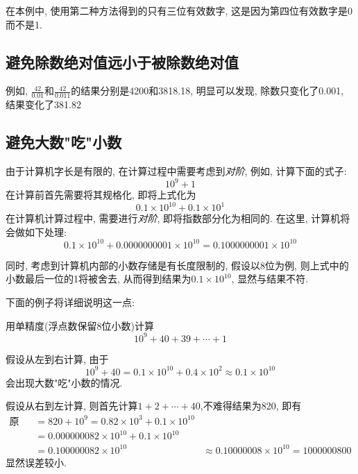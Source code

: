 \begin{notice}
    在本例中, 使用第二种方法得到的只有三位有效数字, 这是因为第四位有效数字是0而不是1.
\end{notice}

\subsection{避免除数绝对值远小于被除数绝对值}

例如, $\frac{42}{0.01}$和$\frac{42}{0.011}$的结果分别是4200和3818.18, 明显可以发现, 除数只变化了0.001, 结果变化了381.82

\subsection{避免大数"吃"小数}

由于计算机字长是有限的, 在计算过程中需要考虑到\emph{对阶}, 例如, 计算下面的式子:
\begin{equation*}
    10^{9}+1
\end{equation*}
在计算前首先需要将其规格化, 即将上式化为
\begin{equation*}
    0.1\times10^{10}+0.1\times10^1
\end{equation*}
在计算机计算过程中, 需要进行\emph{对阶}, 即将指数部分化为相同的. 在这里, 计算机将会做如下处理:
\begin{equation*}
    0.1\times10^{10}+0.0000000001\times10^{10}=0.1000000001\times10^{10}
\end{equation*}

同时, 考虑到计算机内部的小数存储是有长度限制的, 假设以8位为例, 则上式中的小数最后一位的1将被舍去, 从而得到结果为$0.1\times10^{10}$, 显然与结果不符.

下面的例子将详细说明这一点:

\begin{example}
    用单精度(浮点数保留8位小数)计算
    \begin{equation*}
        10^9+40+39+\cdots+1
    \end{equation*}
\end{example}
\begin{solution}
    假设从左到右计算, 由于
    \begin{equation*}
        10^9+40=0.1\times10^{10}+0.4\times10^2\approx0.1\times10^{10}
    \end{equation*}
    会出现大数"吃"小数的情况.

    假设从右到左计算, 则首先计算$1+2+\cdots+40$,不难得结果为820, 即有
    \begin{align*}
        \text{原式} &= 820+10^9 = 0.82\times10^3+0.1\times10^{10}\\
        &=0.000000082\times10^{10}+0.1\times10^{10}\\
        &=0.100000082\times10^{10}
        &\approx0.10000008\times10^{10}=1000000800
    \end{align*}
    显然误差较小.
\end{solution}

